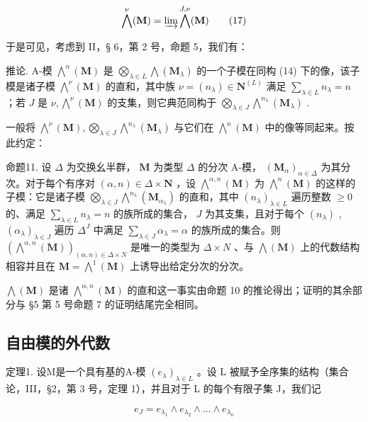 \[
\bigwedge^ {\nu} (\mathbf {M}) = \varinjlim \bigwedge^ {J, \nu} (\mathbf {M})\tag{17}
\]

于是可见，考虑到 II，§ 6，第 2 号，命题 5，我们有：

推论. A-模 \(\bigwedge^{n}(\mathbf{M})\) 是 \(\bigotimes_{\lambda \in L} \bigwedge (\mathbf{M}_{\lambda})\) 的一个子模在同构 (14) 下的像，该子模是诸子模 \(\bigwedge^{\nu}(\mathbf{M})\) 的直和，其中族 \(\nu = (n_{\lambda}) \in \mathbf{N}^{(L)}\) 满足 \(\sum_{\lambda \in L} n_{\lambda} = n\) ；若 \(J\) 是 \(\nu, \bigwedge^{\nu}(\mathbf{M})\) 的支集，则它典范同构于 \(\bigotimes_{\lambda \in J} \bigwedge^{n_{\lambda}}(\mathbf{M}_{\lambda})\) .

一般将 \(\bigwedge^{\nu}(\mathbf{M}),\bigotimes_{\lambda \in J}\bigwedge^{n_{\lambda}}(\mathbf{M}_{\lambda})\) 与它们在 \(\bigwedge^n (\mathbf{M})\) 中的像等同起来。按此约定：

命题11. 设 \(\Delta\) 为交换幺半群， \(\mathbf{M}\) 为类型 \(\Delta\) 的分次 A-模， \((\mathbf{M}_{\alpha})_{\alpha \in \Delta}\) 为其分次。对于每个有序对 \((\alpha, n) \in \Delta \times \mathbf{N}\) ，设 \(\bigwedge^{\alpha, n}(\mathbf{M})\) 为 \(\bigwedge^n (\mathbf{M})\) 的这样的子模：它是诸子模 \(\bigotimes_{\lambda \in J} \bigwedge^{n_{\lambda}}(\mathbf{M}_{\alpha_{\lambda}})\) 的直和，其中 \((n_{\lambda})_{\lambda \in L}\) 遍历整数 \(\geqslant 0\) 的、满足 \(\sum_{\lambda \in L} n_{\lambda} = n\) 的族所成的集合， \(J\) 为其支集，且对于每个 \((n_{\lambda})\) , \((\alpha_{\lambda})_{\lambda \in J}\) 遍历 \(\Delta^J\) 中满足 \(\sum_{\lambda \in J} \alpha_{\lambda} = \alpha\) 的族所成的集合。则 \((\bigwedge^{\alpha, n}(\mathbf{M}))_{(\alpha, n) \in \Delta \times N}\) 是唯一的类型为 \(\Delta \times N\) 、与 \(\bigwedge(\mathbf{M})\) 上的代数结构相容并且在 \(\mathbf{M} = \bigwedge^1 (\mathbf{M})\) 上诱导出给定分次的分次。

\(\bigwedge (\mathbf{M})\) 是诸 \(\bigwedge^{\alpha ,n}(\mathbf{M})\) 的直和这一事实由命题 10 的推论得出；证明的其余部分与 §5 第 5 号命题 7 的证明结尾完全相同。

\subsection{自由模的外代数}

定理1. 设M是一个具有基的A-模 \((e_{\lambda})_{\lambda \in L}\) 。设 L 被赋予全序集的结构（集合论，III，§2，第 3 号，定理 1），并且对于 L 的每个有限子集 J，我们记

\[
e _ {J} = e _ {\lambda_ {1}} \wedge e _ {\lambda_ {2}} \wedge \dots \wedge e _ {\lambda_ {n}}\tag{18}
\]

